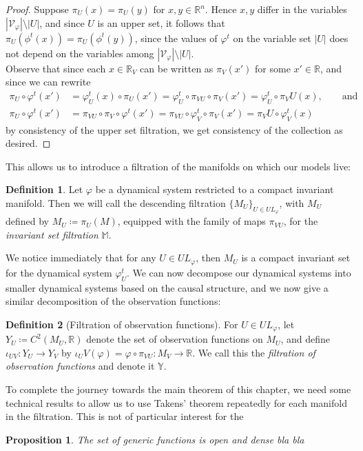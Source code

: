 \documentclass[11pt, a4paper]{memoir}
\theoremstyle{plain}
\newtheorem{prop}{Proposition}
\theoremstyle{definition}
\newtheorem{defn}{Definition}
\newcommand{\mR}{\mathbb{R}}
\begin{document}
\begin{proof}
Suppose $\pi_U(x)=\pi_U(y)$ for $x,y\in \mR^n$. Hence $x,y$ differ in the variables $|\mathcal{V}_\varphi|\setminus |U|$, and since $U$ is an upper set, it follows that $\pi_U(\phi^t(x))=\pi_U(\phi^t(y))$, since the values of $\varphi^t$ on the variable set $|U|$ does not depend on the variables  among $|\mathcal{V}_\varphi|\setminus |U|$.\\
Observe that since each $x\in \mR_V$ can be written as $\pi_V(x')$ for some $x'\in \mR$, and since we can rewrite
\begin{align*}
\pi_U\circ\varphi^t(x')
&=\varphi_U^t(x)\circ\pi_U(x')=
\varphi_U^t\circ\pi_{VU}\circ\pi_V(x')=\varphi_U^t\circ\pi_VU(x),\quad\quad \text{and}\\
\pi_U\circ\varphi^t(x')&=\pi_{VU}\circ \pi_V\circ\varphi^t(x')=\pi_{VU}\circ \varphi_V^t\circ \pi_V(x')=\pi_VU\circ\varphi_V^t(x)
\end{align*}
by consistency of the upper set filtration, we get consistency of the collection as desired.
\end{proof}
This allows us to introduce a filtration of the manifolds on which our models live:
\begin{defn}
Let $\varphi$ be a dynamical system restricted to a compact invariant manifold. Then we will call the descending filtration $\{M_U\}_{U\in UL_\varphi}$, with $M_U$ defined by $M_U\coloneqq \pi_U(M)$, equipped with the family of maps $\pi_{VU}$, for the \emph{invariant set filtration} $\mathbb{M}$.
\end{defn}
We notice immediately that for any $U\in UL_\varphi$, then $M_U$ is a compact invariant set for the dynamical system $\varphi^t_U$. We can now decompose our dynamical systems into smaller dynamical systems based on the causal structure, and we now give a similar decomposition of the observation functions:
\begin{defn}[Filtration of observation functions]
For $U\in UL_\varphi$, let $Y_U\coloneqq C^2(M_U,\mR)$ denote the set of observation functions on $M_U$, and define $\iota_{UV}:Y_U\to Y_V$ by $\iota_UV(\varphi)=\varphi\circ \pi_{VU}:M_V\to \mR$. We call this the \emph{filtration of observation functions} and denote it $\mathbb{Y}$.
\end{defn}
To complete the journey towards the main theorem of this chapter, we need some technical results to allow us to use Takens' theorem repeatedly for each manifold in the filtration. This is not of particular interest for the
\begin{prop}
The set of generic functions is open and dense bla bla
\end{prop}
\end{document}
